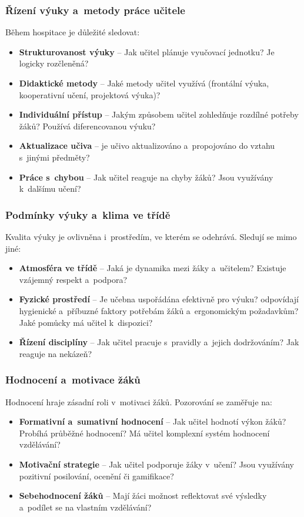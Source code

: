 \subsubsection{Řízení výuky a~metody práce učitele}
Během hospitace je důležité sledovat:
\begin{itemize}
    \item \textbf{Strukturovanost výuky} – Jak učitel plánuje vyučovací jednotku? Je logicky rozčleněná?
    \item \textbf{Didaktické metody} – Jaké metody učitel využívá (frontální výuka, kooperativní učení, projektová výuka)?
    \item \textbf{Individuální přístup} – Jakým způsobem učitel zohledňuje rozdílné potřeby žáků? Používá diferencovanou výuku?
    \item \textbf{Aktualizace učiva} – je učivo aktualizováno a~propojováno do vztahu s~jinými předměty?
    \item \textbf{Práce s~chybou} – Jak učitel reaguje na chyby žáků? Jsou využívány k~dalšímu učení?
\end{itemize}

\subsubsection{Podmínky výuky a~klima ve třídě}
Kvalita výuky je ovlivněna i~prostředím, ve kterém se odehrává. Sledují se mimo jiné:
\begin{itemize}
    \item \textbf{Atmosféra ve třídě} – Jaká je dynamika mezi žáky a~učitelem? Existuje vzájemný respekt a~podpora?
    \item \textbf{Fyzické prostředí} – Je učebna uspořádána efektivně pro výuku? odpovídají hygienické a~příbuzné faktory potřebám žáků a~ergonomickým požadavkům? Jaké pomůcky má učitel k~dispozici?
    \item \textbf{Řízení disciplíny} – Jak učitel pracuje s~pravidly a~jejich dodržováním? Jak reaguje na nekázeň?
\end{itemize}

\subsubsection{Hodnocení a~motivace žáků}
Hodnocení hraje zásadní roli v~motivaci žáků. Pozorování se zaměřuje na:
\begin{itemize}
    \item \textbf{Formativní a~sumativní hodnocení} – Jak učitel hodnotí výkon žáků? Probíhá průběžné hodnocení? Má učitel komplexní systém hodnocení vzdělávání?
    \item \textbf{Motivační strategie} – Jak učitel podporuje žáky v~učení? Jsou využívány pozitivní posilování, ocenění či gamifikace?
    \item \textbf{Sebehodnocení žáků} – Mají žáci možnost reflektovat své výsledky a~podílet se na vlastním vzdělávání?

\end{itemize}

